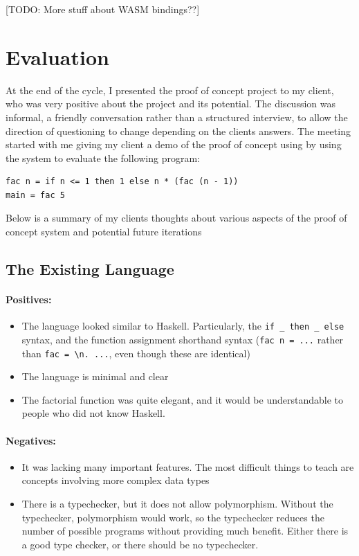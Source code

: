 [TODO: More stuff about WASM bindings??]

\section{Evaluation}
\label{eval:c1}
At the end of the cycle, I presented the proof of concept project to my client, who was very positive about the project and its potential. The discussion was informal, a friendly conversation rather than a structured interview, to allow the direction of questioning to change depending on the clients answers. The meeting started with me giving my client a demo of the proof of concept using by using the system to evaluate the following program:
\begin{verbatim}
fac n = if n <= 1 then 1 else n * (fac (n - 1))
main = fac 5
\end{verbatim}

Below is a summary of my clients thoughts about various aspects of the proof of concept system and potential future iterations

\subsection{The Existing Language}
\paragraph{Positives:}
\begin{itemize}
    \item The language looked similar to Haskell. Particularly, the \verb|if _ then _ else| syntax, and the function assignment shorthand syntax (\verb|fac n = ...| rather than \verb|fac = \n. ...|, even though these are identical)
    \item The language is minimal and clear
    \item The factorial function was quite elegant, and it would be understandable to people who did not know Haskell.  
\end{itemize}

\paragraph{Negatives:}
\begin{itemize}
    \item It was lacking many important features. The most difficult things to teach are concepts involving more complex data types
    \item There is a typechecker, but it does not allow polymorphism. Without the typechecker, polymorphism would work, so the typechecker reduces the number of possible programs without providing much benefit. Either there is a good type checker, or there should be no typechecker. 
\end{itemize}

